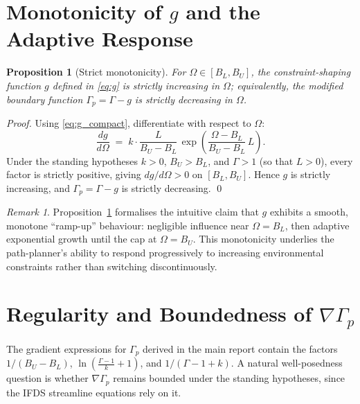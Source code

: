\documentclass[11pt]{article}
\newtheorem{proposition}[theorem]{Proposition}
\theoremstyle{remark}
\newtheorem*{remark}{Remark}
\newcommand{\G}{\Gamma}
\newcommand{\Gp}{\Gamma_p}
\newcommand{\Om}{\Omega}
\begin{document}
\bigskip

\section{Monotonicity of $g$ and the Adaptive Response}

\begin{proposition}[Strict monotonicity]
\label{prop:monotone}
For $\Om\in[B_L,B_U]$, the constraint-shaping function $g$ defined in \eqref{eq:g} is strictly increasing in $\Om$; equivalently, the modified boundary function $\Gp=\G-g$ is strictly decreasing in $\Om$.
\end{proposition}

\begin{proof}
Using \eqref{eq:g_compact}, differentiate with respect to $\Om$:
\[
    \frac{dg}{d\Om}
    \;=\; k\cdot\frac{L}{B_U-B_L}\,\exp\!\left(\frac{\Om-B_L}{B_U-B_L}\,L\right).
\]
Under the standing hypotheses $k>0$, $B_U>B_L$, and $\G>1$ (so that $L>0$), every factor is strictly positive, giving $dg/d\Om>0$ on $[B_L,B_U]$. Hence $g$ is strictly increasing, and $\Gp=\G-g$ is strictly decreasing. \qed
\end{proof}

\begin{remark}
Proposition~\ref{prop:monotone} formalises the intuitive claim that $g$ exhibits a smooth, monotone ``ramp-up'' behaviour: negligible influence near $\Om=B_L$, then adaptive exponential growth until the cap at $\Om=B_U$. This monotonicity underlies the path-planner's ability to respond progressively to increasing environmental constraints rather than switching discontinuously.
\end{remark}

\bigskip

\section{Regularity and Boundedness of $\nabla\Gp$}
\label{sec:regularity}

The gradient expressions for $\Gp$ derived in the main report contain the factors $1/(B_U-B_L)$, $\ln\!\left(\tfrac{\G-1}{k}+1\right)$, and $1/(\G-1+k)$. A natural well-posedness question is whether $\nabla\Gp$ remains bounded under the standing hypotheses, since the IFDS streamline equations rely on it.
\end{document}
